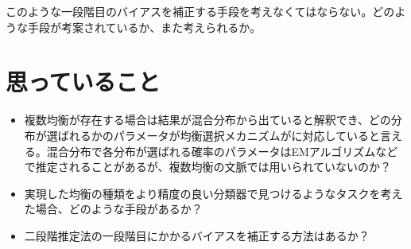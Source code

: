 \documentclass{jsarticle}
\begin{document}
このような一段階目のバイアスを補正する手段を考えなくてはならない。どのような手段が考案されているか、また考えられるか。

\section{思っていること}
\begin{itemize}
	\item 複数均衡が存在する場合は結果が混合分布から出ていると解釈でき、どの分布が選ばれるかのパラメータが均衡選択メカニズムがに対応していると言える。混合分布で各分布が選ばれる確率のパラメータはEMアルゴリズムなどで推定されることがあるが、複数均衡の文脈では用いられていないのか？
	\item 実現した均衡の種類をより精度の良い分類器で見つけるようなタスクを考えた場合、どのような手段があるか？
	\item 二段階推定法の一段階目にかかるバイアスを補正する方法はあるか？
\end{itemize}
\end{document}

